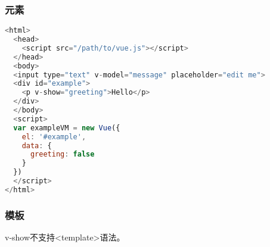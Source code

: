 \subsubsection{元素}


\begin{lstlisting}[language=JavaScript]
<html>
  <head>
    <script src="/path/to/vue.js"></script>
  </head>
  <body>
  <input type="text" v-model="message" placeholder="edit me">
  <div id="example">
    <p v-show="greeting">Hello</p>
  </div>
  </body>
  <script>
  var exampleVM = new Vue({
    el: '#example',
    data: {
      greeting: false
    }
  })
  </script>
</html>
\end{lstlisting}

\subsubsection{模板}

v-show不支持<template>语法。


\begin{lstlisting}[language=JavaScript]

\end{lstlisting}



\begin{lstlisting}[language=JavaScript]

\end{lstlisting}




\begin{lstlisting}[language=JavaScript]

\end{lstlisting}




\begin{lstlisting}[language=JavaScript]

\end{lstlisting}




\begin{lstlisting}[language=JavaScript]

\end{lstlisting}




\begin{lstlisting}[language=JavaScript]

\end{lstlisting}




